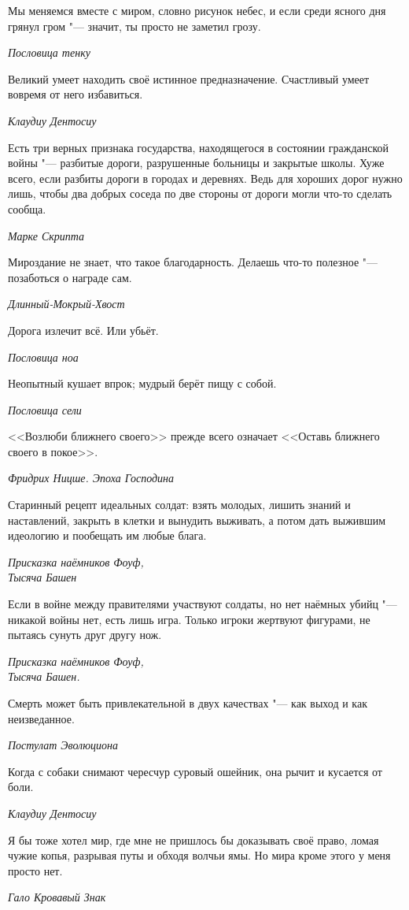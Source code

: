 \documentclass[a4paper,10pt]{book}
\begin{document}
\epigraph{Мы меняемся вместе с миром, словно рисунок небес, 
и если среди ясного дня грянул гром "--- значит, ты просто не заметил грозу.}
{\textit{Пословица тенку}}

\epigraph{Великий умеет находить своё истинное предназначение. 
Счастливый умеет вовремя от него избавиться.}
{\textit{Клаудиу Дентосиу}}

\epigraph{Есть три верных признака государства, 
находящегося в состоянии гражданской войны "--- 
разбитые дороги, разрушенные больницы и закрытые школы.
Хуже всего, если разбиты дороги в городах и деревнях. Ведь для хороших дорог нужно лишь,
чтобы два добрых соседа по две стороны от дороги могли что-то сделать сообща.}
{\textit{Марке Скрипта}}

\epigraph{Мироздание не знает, что такое благодарность. 
Делаешь что-то полезное "--- позаботься о награде сам.}
{\textit{Длинный-Мокрый-Хвост}}

\epigraph{Дорога излечит всё. Или убьёт.}
{\textit{Пословица ноа}}

\epigraph{Неопытный кушает впрок; мудрый берёт пищу с собой.}
{\textit{Пословица сели}}

\epigraph{<<Возлюби ближнего своего>> прежде всего означает <<Оставь ближнего 
своего в покое>>.}
{\textit{Фридрих Ницше. Эпоха Господина}}

\epigraph{Старинный рецепт идеальных солдат: взять молодых, 
лишить знаний и наставлений, закрыть в клетки и вынудить выживать, 
а потом дать выжившим идеологию и пообещать им любые блага.}
{\textit{Присказка наёмников Фоуф,\\Тысяча Башен}}

\epigraph{Если в войне между правителями участвуют солдаты, но нет наёмных 
убийц 
"--- никакой войны нет, есть лишь игра. Только игроки жертвуют фигурами, не 
пытаясь сунуть друг другу нож.}
{\textit{Присказка наёмников Фоуф,\\Тысяча Башен.}}


 \epigraph{Смерть может быть привлекательной в двух качествах "--- как выход и 
как неизведанное.}
{\textit{Постулат Эволюциона}}

\epigraph{Когда с собаки снимают чересчур суровый ошейник, она рычит и кусается 
от боли.}
{\textit{Клаудиу Дентосиу}}

\epigraph{Я бы тоже хотел мир, где мне не пришлось бы доказывать своё право,
ломая чужие копья, разрывая путы и обходя волчьи ямы. Но мира кроме этого у 
меня 
просто нет.}
{\textit{Гало Кровавый Знак}}
\end{document}
